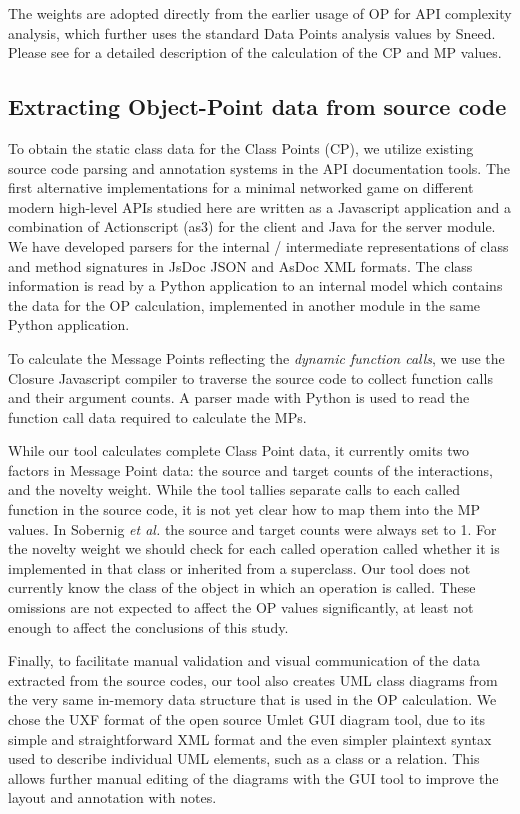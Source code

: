 \documentclass[conference]{IEEEtran}
\begin{document}
The weights are adopted directly from the earlier usage of OP for API
complexity analysis, which further uses the standard Data Points
analysis values by Sneed. Please see \cite{api-complexity-analysis} for a
detailed description of the calculation of the CP and MP values.


\subsection{Extracting Object-Point data from source code%
  \label{extracting-object-point-data-from-source-code}%
}

To obtain the static class data for the Class Points (CP), we utilize
existing source code parsing and annotation systems in the API
documentation tools. The first alternative implementations for a
minimal networked game on different modern high-level APIs studied
here are written as a Javascript application and a combination of
Actionscript (as3) for the client and Java for the server module. We
have developed parsers for the internal / intermediate representations
of class and method signatures in JsDoc JSON and AsDoc XML
formats. The class information is read by a Python application to an
internal model which contains the data for the OP calculation,
implemented in another module in the same Python application.

To calculate the Message Points reflecting the \emph{dynamic function
calls}, we use the Closure Javascript compiler to traverse the source
code to collect function calls and their argument counts.  A parser
made with Python is used to read the function call data required to
calculate the MPs.

While our tool calculates complete Class Point data, it currently
omits two factors in Message Point data: the source and target counts
of the interactions, and the novelty weight. While the tool tallies
separate calls to each called function in the source code, it is not
yet clear how to map them into the MP values. In Sobernig \emph{et al.} the
source and target counts were always set to 1. For the novelty weight
we should check for each called operation called whether it is
implemented in that class or inherited from a superclass. Our tool
does not currently know the class of the object in which an operation
is called. These omissions are not expected to affect the OP values
significantly, at least not enough to affect the conclusions of this
study.

Finally, to facilitate manual validation and visual communication of
the data extracted from the source codes, our tool also creates UML
class diagrams from the very same in-memory data structure that is
used in the OP calculation. We chose the UXF format of the open source
Umlet GUI diagram tool, due to its simple and straightforward XML
format and the even simpler plaintext syntax used to describe
individual UML elements, such as a class or a relation. This allows
further manual editing of the diagrams with the GUI tool to improve
the layout and annotation with notes.
\end{document}
